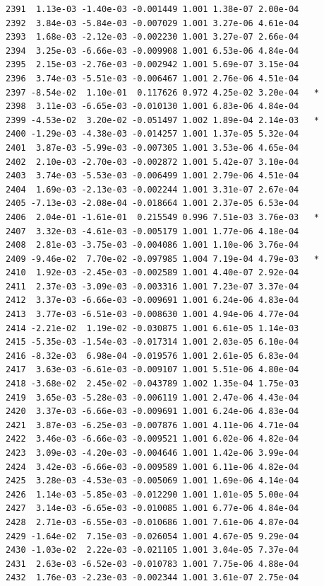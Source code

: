 \documentclass[
  letterpaper,
  DIV=11,
  numbers=noendperiod]{scrartcl}
\begin{document}
\begin{verbatim}
2391  1.13e-03 -1.40e-03 -0.001449 1.001 1.38e-07 2.00e-04    
2392  3.84e-03 -5.84e-03 -0.007029 1.001 3.27e-06 4.61e-04    
2393  1.68e-03 -2.12e-03 -0.002230 1.001 3.27e-07 2.66e-04    
2394  3.25e-03 -6.66e-03 -0.009908 1.001 6.53e-06 4.84e-04    
2395  2.15e-03 -2.76e-03 -0.002942 1.001 5.69e-07 3.15e-04    
2396  3.74e-03 -5.51e-03 -0.006467 1.001 2.76e-06 4.51e-04    
2397 -8.54e-02  1.10e-01  0.117626 0.972 4.25e-02 3.20e-04   *
2398  3.11e-03 -6.65e-03 -0.010130 1.001 6.83e-06 4.84e-04    
2399 -4.53e-02  3.20e-02 -0.051497 1.002 1.89e-04 2.14e-03   *
2400 -1.29e-03 -4.38e-03 -0.014257 1.001 1.37e-05 5.32e-04    
2401  3.87e-03 -5.99e-03 -0.007305 1.001 3.53e-06 4.65e-04    
2402  2.10e-03 -2.70e-03 -0.002872 1.001 5.42e-07 3.10e-04    
2403  3.74e-03 -5.53e-03 -0.006499 1.001 2.79e-06 4.51e-04    
2404  1.69e-03 -2.13e-03 -0.002244 1.001 3.31e-07 2.67e-04    
2405 -7.13e-03 -2.08e-04 -0.018664 1.001 2.37e-05 6.53e-04    
2406  2.04e-01 -1.61e-01  0.215549 0.996 7.51e-03 3.76e-03   *
2407  3.32e-03 -4.61e-03 -0.005179 1.001 1.77e-06 4.18e-04    
2408  2.81e-03 -3.75e-03 -0.004086 1.001 1.10e-06 3.76e-04    
2409 -9.46e-02  7.70e-02 -0.097985 1.004 7.19e-04 4.79e-03   *
2410  1.92e-03 -2.45e-03 -0.002589 1.001 4.40e-07 2.92e-04    
2411  2.37e-03 -3.09e-03 -0.003316 1.001 7.23e-07 3.37e-04    
2412  3.37e-03 -6.66e-03 -0.009691 1.001 6.24e-06 4.83e-04    
2413  3.77e-03 -6.51e-03 -0.008630 1.001 4.94e-06 4.77e-04    
2414 -2.21e-02  1.19e-02 -0.030875 1.001 6.61e-05 1.14e-03    
2415 -5.35e-03 -1.54e-03 -0.017314 1.001 2.03e-05 6.10e-04    
2416 -8.32e-03  6.98e-04 -0.019576 1.001 2.61e-05 6.83e-04    
2417  3.63e-03 -6.61e-03 -0.009107 1.001 5.51e-06 4.80e-04    
2418 -3.68e-02  2.45e-02 -0.043789 1.002 1.35e-04 1.75e-03    
2419  3.65e-03 -5.28e-03 -0.006119 1.001 2.47e-06 4.43e-04    
2420  3.37e-03 -6.66e-03 -0.009691 1.001 6.24e-06 4.83e-04    
2421  3.87e-03 -6.25e-03 -0.007876 1.001 4.11e-06 4.71e-04    
2422  3.46e-03 -6.66e-03 -0.009521 1.001 6.02e-06 4.82e-04    
2423  3.09e-03 -4.20e-03 -0.004646 1.001 1.42e-06 3.99e-04    
2424  3.42e-03 -6.66e-03 -0.009589 1.001 6.11e-06 4.82e-04    
2425  3.28e-03 -4.53e-03 -0.005069 1.001 1.69e-06 4.14e-04    
2426  1.14e-03 -5.85e-03 -0.012290 1.001 1.01e-05 5.00e-04    
2427  3.14e-03 -6.65e-03 -0.010085 1.001 6.77e-06 4.84e-04    
2428  2.71e-03 -6.55e-03 -0.010686 1.001 7.61e-06 4.87e-04    
2429 -1.64e-02  7.15e-03 -0.026054 1.001 4.67e-05 9.29e-04    
2430 -1.03e-02  2.22e-03 -0.021105 1.001 3.04e-05 7.37e-04    
2431  2.63e-03 -6.52e-03 -0.010783 1.001 7.75e-06 4.88e-04    
2432  1.76e-03 -2.23e-03 -0.002344 1.001 3.61e-07 2.75e-04    

\end{verbatim}
\end{document}
